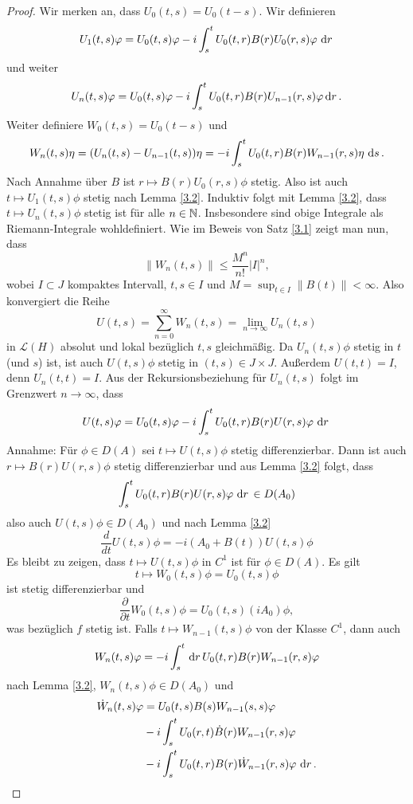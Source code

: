 \documentclass{mycourse}
\begin{document}
\begin{proof}
Wir merken an, dass $U_0(t,s)=U_0(t-s)$. Wir definieren
\[
U_1(t,s)\phi= U_0(t,s)\phi-i \int_s^t U_0(t,r) B(r) U_0(r,s) \phi\, \dx[r]
\]
und weiter
\[
U_n(t,s) \phi = U_0(t,s) \phi-i \int_s^t U_0(t,r) B(r) U_{n-1}(r,s) \phi \dx[r].
\]
Weiter definiere $W_0(t,s)=U_0(t-s)$  und 
\[
W_n(t,s)\eta= (U_n(t,s)-U_{n-1}(t,s))\eta= -i \int_s^t U_0(t,r) B(r) W_{n-1} (r,s) \eta \, \dx[s].
\] 
Nach Annahme über $B$ ist $r\mapsto B(r) U_0(r,s) \phi$ stetig. Also ist auch $t\mapsto U_1(t,s) \phi$ stetig nach Lemma \ref{3.2}.  Induktiv folgt mit Lemma \ref{3.2}, dass $t\mapsto U_n(t,s) \phi$ stetig ist für alle $n\in \N$. Insbesondere sind obige Integrale als Riemann-Integrale wohldefiniert. Wie im Beweis von Satz \ref{3.1} zeigt man nun, dass
\[
\|W_n(t,s)\| \le \frac{M^n}{n!} |I|^n,
\]
wobei $I\subset J$ kompaktes Intervall, $t,s\in I$ und $M=\sup_{t\in I} \| B(t) \| < \infty$. Also konvergiert die Reihe
\[
U(t,s)=\sum_{n=0}^\infty W_n(t,s)=\lim_{n\to \infty} U_n(t,s)
\]
in $\mathcal L(H)$ absolut und lokal bezüglich $t,s$ gleichmäßig. Da $U_n(t,s) \phi$ stetig in $t$ (und $s$) ist, ist auch $U(t,s)\phi$ stetig in $(t,s)\in J\times J$. Außerdem $U(t,t)=I$, denn $U_n(t,t)=I$.
Aus der Rekursionsbeziehung für $U_n(t,s)$ folgt im Grenzwert $n\to \infty$, dass
\[
U(t,s) \phi= U_0(t,s)\phi-i \int_s^t U_0(t,r) B(r) U(r,s) \phi\, \dx[r]
\]
Annahme: Für $\phi \in D(A)$ sei $t\mapsto U(t,s) \phi$ stetig differenzierbar. Dann ist auch $r\mapsto B(r) U(r,s) \phi$ stetig differenzierbar und aus Lemma \ref{3.2} folgt, dass
\[
\int_s^t U_0(t,r) B(r) U(r,s) \phi \, \dx[r] \in D(A_0)
\]
also auch $U(t,s)\phi \in D(A_0)$ und nach Lemma \ref{3.2}
\[
\frac{d}{dt} U(t,s) \phi=-i (A_0 +B(t)) U(t,s) \phi
\]
Es bleibt zu zeigen, dass $t\mapsto U(t,s)\phi$ in $C^1$ ist für $\phi\in D(A)$. Es gilt
\[
t \mapsto W_0(t,s) \phi = U_0(t,s) \phi
\]
ist stetig differenzierbar und
\[
\frac{\partial}{\partial t} W_0(t,s) \phi = U_0(t,s) (iA_0) \phi,
\]
was bezüglich $f$ stetig ist. Falls $t\mapsto W_{n-1} (t,s) \phi$ von der Klasse $C^1$, dann auch
\[
W_n(t,s) \phi=-i \int_s^t \dx[r] U_0(t,r) B(r) W_{n-1}(r,s) \phi
\]
nach Lemma \ref{3.2}, $W_n(t,s) \phi \in D(A_0)$ und
\begin{align*}
\dot W_n(t,s) \phi &= U_0(t,s) B(s) W_{n-1}(s, s) \phi\\
&- i\int_s^t U_0(r,t) \dot B(r) W_{n-1}(r,s) \phi \\
& -i\int_s^t U_0(t,r) B(r) \dot W_{n-1} (r,s) \phi \, \dx[r]. 
\end{align*}


\end{proof}
\end{document}
